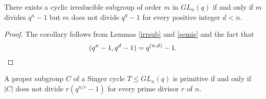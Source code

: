 \begin{Cor}\label{semis1}
There exists a cyclic irreducible subgroup of order $m$ in $GL_n(q)$ if
and only if $m$ divides $q^n - 1$ but $m$ does not divide $q^d - 1$ for every positive
integer $d < n$.
\end{Cor}
\begin{proof}
The corollary follows from Lemmas \ref{irrsub} and \ref{semis} and the fact that 
\begin{equation*}(q^n-1,q^d-1)=q^{(n,d)}-1.
 \qedhere 
\end{equation*}  
\end{proof}

\begin{Lem}
A proper subgroup $C$ of a Singer cycle $T \le GL_n(q)$ is primitive if and only if $|C|$ does not divide $r(q^{n/r}-1)$ for every prime divisor $r$ of $n$. 
\end{Lem}
